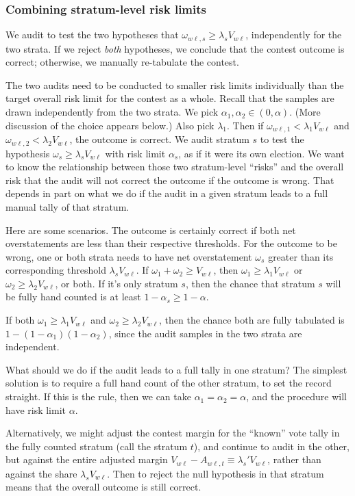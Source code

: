 \subsubsection{Combining stratum-level risk limits}\label{sec:stratumRisk}
We audit to test the two hypotheses that $\omega_{w\ell,s} \ge \lambda_s V_{w\ell}$, 
independently for the two strata.
If we reject \emph{both} hypotheses, we conclude that the contest outcome is correct;
otherwise, we manually re-tabulate the contest.

The two audits need to be conducted to smaller risk limits individually than the target overall
risk limit for the contest as a whole.
Recall that the samples are drawn independently from the two strata.
We pick $\alpha_1, \alpha_2 \in (0,\alpha)$.
(More discussion of the choice appears below.)
Also pick $\lambda_1$.
Then if $\omega_{w\ell,1} < \lambda_1 V_{w\ell}$ and 
$\omega_{w\ell,2} < \lambda_2 V_{w\ell}$,
the outcome is correct.
We audit stratum $s$ to test the hypothesis $\omega_s \ge \lambda_s V_{w\ell}$ 
with risk limit $\alpha_s$,
as if it were its own election.
We want to know the relationship between those two stratum-level ``risks'' and the 
overall risk that the audit will not correct the outcome if the outcome is wrong.
That depends in part on what we do if the audit in a given stratum leads to a full manual
tally of that stratum.

Here are some scenarios.
The outcome is certainly correct if both net overstatements are less than their 
respective thresholds. 
For the outcome to be wrong, one or both strata needs to have net overstatement
$\omega_s$
greater than its corresponding threshold $\lambda_s V_{w\ell}$.
If $\omega_1 + \omega_2 \ge V_{w\ell}$, then $\omega_1\ge \lambda_1V_{w\ell}$
or $\omega_2\ge \lambda_2V_{w\ell}$, or both.
If it's only stratum $s$, then the chance that stratum $s$ will be fully hand
counted is at least $1-\alpha_s \ge 1- \alpha$.

If both $\omega_1\ge \lambda_1V_{w\ell}$
and $\omega_2\ge \lambda_2V_{w\ell}$, then the chance both are fully tabulated is
$1-(1-\alpha_1)(1-\alpha_2)$, since the audit samples in the two strata are independent.

What should we do if the audit leads to a full tally in one stratum?
The simplest solution is to require a full hand count of the other stratum, to set the record straight.
If this is the rule, then we can take $\alpha_1 = \alpha_2 = \alpha$, and the procedure will have
risk limit $\alpha$.

Alternatively, we might adjust the contest margin for the ``known'' vote tally in the
fully counted stratum (call the stratum $t$), and continue to audit in the other, but against the entire adjusted
margin $V_{w\ell} - A_{w\ell,t} \equiv \lambda_s' V_{w\ell}$, rather than 
against the share $\lambda_s V_{w\ell}$.
Then to reject the null hypothesis in that stratum means that the overall outcome is still correct.

